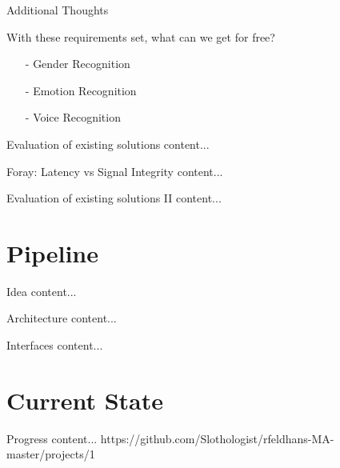 \documentclass{beamer}
\begin{document}
	
	\begin{frame}{Additional Thoughts}
		\begin{alertblock}{With these requirements set, what can we get for free?}
			\pause
			\begin{itemize}
				\item[-] Gender Recognition
				\item[-] Emotion Recognition
				\item[-] Voice Recognition
			\end{itemize}
		\end{alertblock}
	\end{frame}

	\begin{frame}{Evaluation of existing solutions}
		content...
	\end{frame}
	
	\begin{frame}{Foray: Latency vs Signal Integrity}
		content...
	\end{frame}
	
	\begin{frame}{Evaluation of existing solutions II}
		content...
	\end{frame}
	
	
	
	
	
	

	\section{Pipeline}
	
	\begin{frame}{Idea}
		content...
	\end{frame}
	
	\begin{frame}{Architecture}
		content...
	\end{frame}
	
	\begin{frame}{Interfaces}
		content...
	\end{frame}
	
	
	
	
	
	
	
	
	\section{Current State}
	\begin{frame}{Progress}
		content...
		https://github.com/Slothologist/rfeldhans-MA-master/projects/1
	\end{frame}
	
\end{document}
